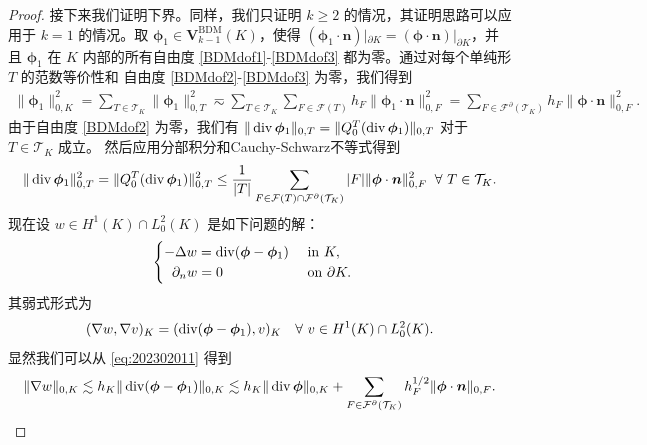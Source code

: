 \begin{proof}
接下来我们证明下界。同样，我们只证明 $k\geq2$ 的情况，其证明思路可以应用于 $k=1$
的情况。取 $\boldsymbol{\phi}_1\in\boldsymbol{V}_{k-1}^{\mathrm{BDM}}(K)$，使得
$(\boldsymbol{\phi}_1\cdot\boldsymbol{n})|_{\partial
K}=(\boldsymbol{\phi}\cdot\boldsymbol{n})|_{\partial K}$，并且
$\boldsymbol{\phi}_1$ 在 $K$ 内部的所有自由度 \eqref{BDMdof1}-\eqref{BDMdof3}
都为零。通过对每个单纯形 $T$ 的范数等价性和 自由度 \eqref{BDMdof2}-\eqref{BDMdof3}
为零，我们得到
\begin{align}\label{eq:20220324-5}
\|\boldsymbol{\phi}_1\|_{0,K}^2 = \sum_{T\in\mathcal T_K}\|\boldsymbol{\phi}_1\|_{0,T}^2 \eqsim \sum_{T\in\mathcal T_K}\sum_{F\in\mathcal F(T)}h_F\|\boldsymbol{\phi}_1\cdot\boldsymbol{n}\|_{0,F}^2 =\sum_{F\in\mathcal F^{\partial}(\mathcal T_K)}h_F\|\boldsymbol{\phi}\cdot\boldsymbol{n}\|_{0,F}^2.
\end{align}
由于自由度 \eqref{BDMdof2} 为零，我们有 $\|\operatorname{div}\boldsymbol{\phi}_1\|_{0, T}
=\|Q_0^T(\operatorname{div}\boldsymbol{\phi}_1)\|_{0, T}$ 对于 $T\in\mathcal T_K$ 成立。
然后应用分部积分和Cauchy-Schwarz不等式得到
\begin{equation}\label{eq:202302011}
\|\operatorname{div}\boldsymbol{\phi}_1\|_{0,T}^2=\|Q_0^T(\operatorname{div}\boldsymbol{\phi}_1)\|_{0,T}^2
\leq\frac{1}{|T|}\sum_{F\in\mathcal F(T)\cap\mathcal F^{\partial}(\mathcal T_K)}|F|\|\boldsymbol{\phi}\cdot\boldsymbol{n}\|_{0,F}^2\;\;\forall~T\in\mathcal T_K.
\end{equation}
现在设 $w\in H^1(K)\cap L_0^2(K)$ 是如下问题的解：
\[
\begin{cases}
-\Delta w= \operatorname{div}(\boldsymbol{\phi}-\boldsymbol{\phi}_1)\quad\text{ in } K, \\
\;\;\partial_nw=0\qquad\qquad\quad\;\;\,\text{ on } \partial K.
\end{cases}
\]
其弱式形式为
\[
(\nabla w, \nabla v)_K=(\operatorname{div}(\boldsymbol{\phi}-\boldsymbol{\phi}_1), v)_K\quad\forall~v\in H^1(K)\cap L_0^2(K).
\]
显然我们可以从 \eqref{eq:202302011} 得到
\begin{equation}\label{eq:202302031}  
\|\nabla w\|_{0,K}\lesssim h_K\|\operatorname{div}(\boldsymbol{\phi}-\boldsymbol{\phi}_1)\|_{0,K}\lesssim h_K\|\operatorname{div}\boldsymbol{\phi}\|_{0,K} +\sum_{F\in\mathcal F^{\partial}(\mathcal T_K)}h_F^{1/2}\|\boldsymbol{\phi}\cdot\boldsymbol{n}\|_{0,F}.
\end{equation}

\end{proof}
